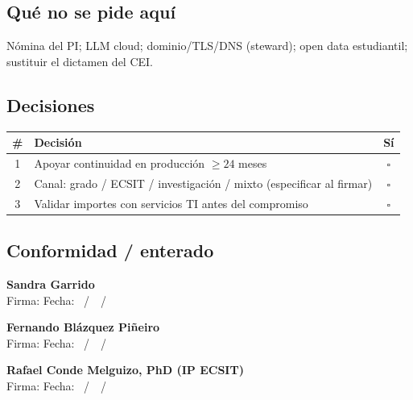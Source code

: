 \documentclass[11pt,a4paper]{scrartcl}
\begin{document}
\subsection*{Qué no se pide aquí}
Nómina del PI; LLM cloud; dominio/TLS/DNS (steward); open data estudiantil;
sustituir el dictamen del CEI.

\subsection*{Decisiones}
\renewcommand{\arraystretch}{1.3}
\begin{tabularx}{\textwidth}{@{}c>{\raggedright\arraybackslash}X c@{}}
  \toprule
  \textbf{\#} & \textbf{Decisión} & \textbf{Sí} \\
  \midrule
  1 & Apoyar continuidad en producción $\geq 24$ meses & $\square$ \\
  2 & Canal: grado / ECSIT / investigación / mixto (especificar al firmar) & $\square$ \\
  3 & Validar importes con servicios TI antes del compromiso & $\square$ \\
  \bottomrule
\end{tabularx}

\subsection*{Conformidad / enterado}
\vspace{0.55em}
\noindent\textbf{Sandra Garrido}\\
Firma: \hrulefill\quad Fecha: \underline{\hspace{1.1cm}}~/~\underline{\hspace{1.1cm}}~/~\underline{\hspace{2cm}}

\vspace{0.7em}
\noindent\textbf{Fernando Blázquez Piñeiro}\\
Firma: \hrulefill\quad Fecha: \underline{\hspace{1.1cm}}~/~\underline{\hspace{1.1cm}}~/~\underline{\hspace{2cm}}

\vspace{0.7em}
\noindent\textbf{Rafael Conde Melguizo, PhD (IP ECSIT)}\\
Firma: \hrulefill\quad Fecha: \underline{\hspace{1.1cm}}~/~\underline{\hspace{1.1cm}}~/~\underline{\hspace{2cm}}
\end{document}

